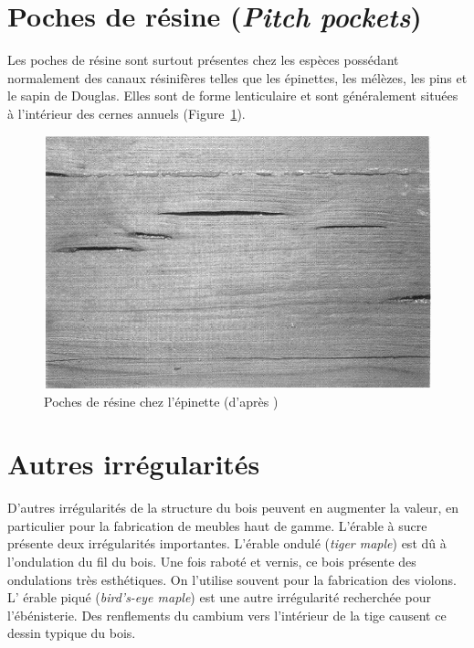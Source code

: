 \section{Poches de résine (\textit{Pitch pockets})}

Les poches de résine sont surtout présentes chez les espèces possédant normalement des canaux résinifères telles que les épinettes, les mélèzes, les pins et le sapin de Douglas. Elles sont de forme lenticulaire et sont généralement situées à l'intérieur des cernes annuels (Figure~\ref{fig:poches}).

\begin{figure}[h]
	\centering
	\includegraphics[scale=0.7]{img/ch9_poches}
	\caption{Poches de résine chez l'épinette (d'après \cite{hoadley1990identifying})}
	\label{fig:poches}
\end{figure}

\section{Autres irrégularités}

D'autres irrégularités de la structure du bois peuvent en augmenter la valeur, en particulier pour la fabrication de meubles haut de gamme. L'érable à sucre présente deux irrégularités importantes. L'\og érable ondulé  \fg (\textit{tiger maple}) est dû à l'ondulation du fil du bois. Une fois raboté et vernis, ce bois présente des ondulations très esthétiques. On l'utilise souvent pour la fabrication des violons. L'  \og érable piqué  \fg (\textit{bird's-eye maple}) est une autre irrégularité recherchée pour l'ébénisterie. Des renflements du cambium vers l'intérieur de la tige causent ce dessin typique du bois.





%
%
%
%
%
%
%
%
%
%
%
%
